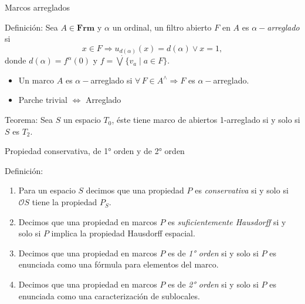 \documentclass[compress,12pt]{beamer}
\begin{document}
\begin{frame}{Marcos arreglados}
	\begin{block}{Definición:}
		Sea $A\in \mathbf{Frm}$ y $\alpha$ un ordinal, un filtro abierto $F$ en $A$ es $\alpha-$\emph{arreglado} si \[x\in F\Rightarrow u_{d(\alpha)}(x)=d(\alpha)\vee x=1,\] donde $d(\alpha)=f^{\alpha}(0)$ y $f=\dot\bigvee\{v_a\mid a\in F\}$.
	\end{block}

	\begin{itemize}
	\item<2-> Un marco $A$ es $\alpha-$arreglado si $\forall\, F\in A^\wedge \Rightarrow F$ es $\alpha-$arreglado.
    \item<3-> Parche trivial $\Leftrightarrow$ Arreglado	
    \end{itemize}
\end{frame}

\begin{frame}
	\begin{block}{Teorema:}
		Sea $S$ un espacio $T_{0}$, éste tiene \alert<2->{marco de abiertos 1-arreglado si y solo si $S$ es $T_2$}.
	\end{block}

\end{frame}

\begin{frame}{Propiedad conservativa, de 1° orden y de 2° orden}

	\begin{block}{Definición:}
		\begin{enumerate}
			\item Para un espacio $S$ decimos que una propiedad $P$ es \emph{conservativa} si y solo si $\mathcal{O}S$ tiene la propiedad $P_S$.
	
			\item<2-> Decimos que una propiedad en marcos $P$ es \emph{suficientemente Hausdorff} si y solo si $P$ implica la propiedad Hausdorff espacial.
			
			\item<3-> Decimos que una propiedad en marcos $P$ es de \emph{1° orden} si y solo si $P$ es enunciada como una fórmula para elementos del marco.
	
			\item<4-> Decimos que una propiedad en marcos $P$ es de \emph{2° orden} si y solo si $P$ es enunciada como una caracterización de sublocales.
		\end{enumerate}
	\end{block}
	
	\end{frame}
\end{document}
